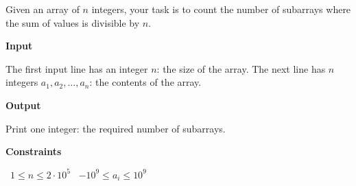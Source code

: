 Given an array of $n$ integers, your task is to count the number of subarrays where the sum of values is divisible by $n$.

\vspace{0.3cm}\noindent\textbf{Input}

The first input line has an integer $n$: the size of the array.
The next line has $n$ integers $a_1,a_2,\dots,a_n$: the contents of the array.

\vspace{0.3cm}\noindent\textbf{Output}

Print one integer: the required number of subarrays.

\vspace{0.3cm}\noindent\textbf{Constraints}

\textbullet\ $1 \le n \le 2 \cdot 10^5$
\textbullet\ $-10^9 \le a_i \le 10^9$
